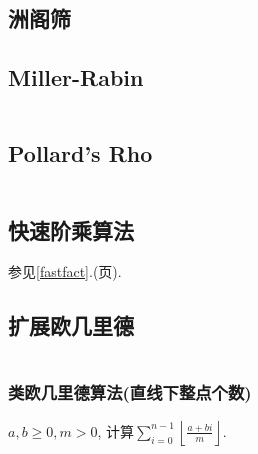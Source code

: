 \documentclass[a4paper, twoside]{article}
\begin{document}
\begin{multicols}{2}
			\subsection{洲阁筛}
				



			\subsection{Miller-Rabin}
				\inputminted{cpp}{../src/numbertheory/Miller-Rabin.cpp}

			\subsection{Pollard's Rho}
				\inputminted{cpp}{../src/numbertheory/Pollard-Rho.cpp}
			
			\subsection{快速阶乘算法}
				参见\ref{fastfact}.(\pageref{fastfact}页).



			\subsection{扩展欧几里德}
				\inputminted{cpp}{../src/numbertheory/exgcd.cpp}
				

				\subsubsection{类欧几里德算法(直线下整点个数)}
					$a,b \ge 0, m > 0$, 计算$\sum_{i = 0} ^ {n - 1} \left\lfloor \frac {a + bi} m \right\rfloor$.
					\inputminted{cpp}{../src/numbertheory/类欧.cpp}
			

\end{multicols}
\end{document}
